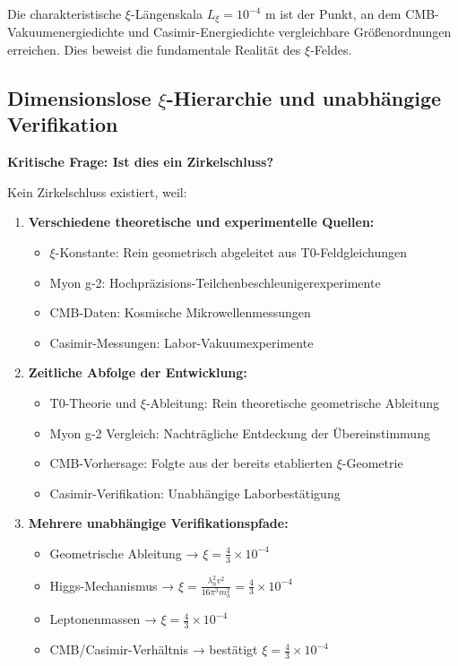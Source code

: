 	\begin{important}
		Die charakteristische $\xi$-Längenskala $L_\xi = 10^{-4}$ m ist der Punkt, an dem CMB-Vakuumenergiedichte und Casimir-Energiedichte vergleichbare Größ{}enordnungen erreichen. Dies beweist die fundamentale Realität des $\xi$-Feldes.
	\end{important}
	
	\subsection{Dimensionslose $\xi$-Hierarchie und unabhängige Verifikation}
	
	\textbf{Kritische Frage: Ist dies ein Zirkelschluss?}
	
	Kein Zirkelschluss existiert, weil:
	
	\begin{enumerate}
		\item \textbf{Verschiedene theoretische und experimentelle Quellen:}
		\begin{itemize}
			\item $\xi$-Konstante: Rein geometrisch abgeleitet aus T0-Feldgleichungen
			\item Myon g-2: Hochpräzisions-Teilchenbeschleunigerexperimente
			\item CMB-Daten: Kosmische Mikrowellenmessungen
			\item Casimir-Messungen: Labor-Vakuumexperimente
		\end{itemize}
		
		\item \textbf{Zeitliche Abfolge der Entwicklung:}
		\begin{itemize}
			\item T0-Theorie und $\xi$-Ableitung: Rein theoretische geometrische Ableitung
			\item Myon g-2 Vergleich: Nachträgliche Entdeckung der Übereinstimmung
			\item CMB-Vorhersage: Folgte aus der bereits etablierten $\xi$-Geometrie
			\item Casimir-Verifikation: Unabhängige Laborbestätigung
		\end{itemize}
		
		\item \textbf{Mehrere unabhängige Verifikationspfade:}
		\begin{itemize}
			\item Geometrische Ableitung → $\xi = \frac{4}{3} \times 10^{-4}$
			\item Higgs-Mechanismus → $\xi = \frac{\lambda_h^2 v^2}{16\pi^3 m_h^2} = \frac{4}{3} \times 10^{-4}$
			\item Leptonenmassen → $\xi = \frac{4}{3} \times 10^{-4}$
			\item CMB/Casimir-Verhältnis → bestätigt $\xi = \frac{4}{3} \times 10^{-4}$
		\end{itemize}
	\end{enumerate}
	
